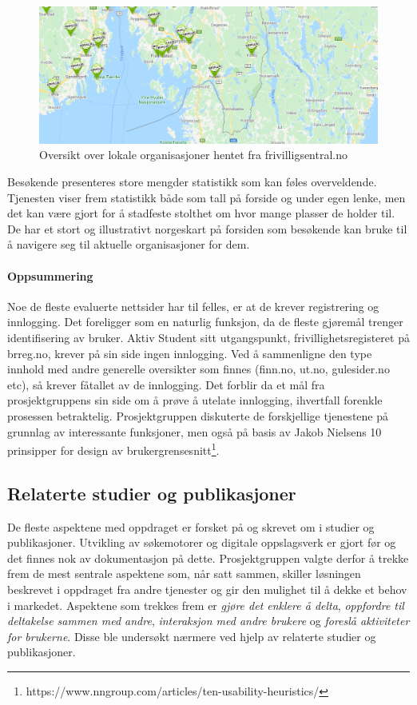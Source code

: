 \begin{figure}[H]
\centering
\includegraphics[width=1\textwidth]{Illustrasjoner/frivillig_kart.png}
\caption{Oversikt over lokale organisasjoner hentet fra frivilligsentral.no}
\end{figure}

Besøkende presenteres store mengder statistikk som kan føles overveldende. Tjenesten viser frem statistikk både som tall på forside og under egen lenke, men det kan være gjort for å stadfeste stolthet om hvor mange plasser de holder til. De har et stort og illustrativt norgeskart på forsiden som besøkende kan bruke til å navigere seg til aktuelle organisasjoner for dem.

\paragraph{Oppsummering}
Noe de fleste evaluerte nettsider har til felles, er at de krever registrering og innlogging. Det foreligger som en naturlig funksjon, da de fleste gjøremål trenger identifisering av bruker. Aktiv Student sitt utgangspunkt, frivillighetsregisteret på brreg.no, krever på sin side ingen innlogging. Ved å sammenligne den type innhold med andre generelle oversikter som finnes (finn.no, ut.no, gulesider.no etc), så krever fåtallet av de innlogging. Det forblir da et mål fra prosjektgruppens sin side om å prøve å utelate innlogging, ihvertfall forenkle prosessen betraktelig. Prosjektgruppen diskuterte de forskjellige tjenestene på grunnlag av interessante funksjoner, men også på basis av Jakob Nielsens 10 prinsipper for design av brukergrensesnitt\footnote{https://www.nngroup.com/articles/ten-usability-heuristics/}.


\subsection{Relaterte studier og publikasjoner}
De fleste aspektene med oppdraget er forsket på og skrevet om i studier og publikasjoner. Utvikling av søkemotorer og digitale oppslagsverk er gjort før og det finnes nok av dokumentasjon på dette. Prosjektgruppen valgte derfor å trekke frem de mest sentrale aspektene som, når satt sammen, skiller løsningen beskrevet i oppdraget fra andre tjenester og gir den mulighet til å dekke et behov i markedet. Aspektene som trekkes frem er {\em gjøre det enklere å delta}, {\em oppfordre til deltakelse sammen med andre}, {\em interaksjon med andre brukere} og {\em foreslå aktiviteter for brukerne}. Disse ble undersøkt nærmere ved hjelp av relaterte studier og publikasjoner.

